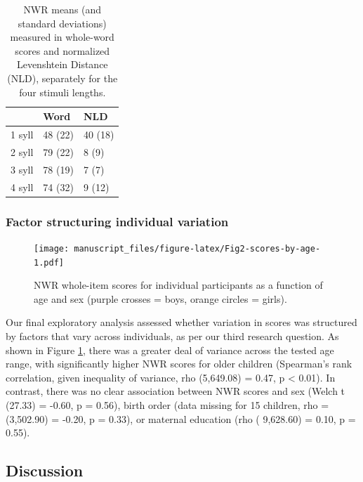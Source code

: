 \documentclass[english,,man,floatsintext]{apa6}
\begin{document}
\begin{table}

\caption{\label{tab:tablength}NWR means (and standard deviations) measured in whole-word scores and normalized Levenshtein Distance (NLD), separately for the four stimuli lengths.}
\centering
\begin{tabular}[t]{lll}
\toprule
  & Word & NLD\\
\midrule
1 syll & 48 (22) & 40 (18)\\
2 syll & 79 (22) & 8 (9)\\
3 syll & 78 (19) & 7 (7)\\
4 syll & 74 (32) & 9 (12)\\
\bottomrule
\end{tabular}
\end{table}

\hypertarget{factor-structuring-individual-variation}{%
\subsubsection{Factor structuring individual variation}\label{factor-structuring-individual-variation}}

\begin{figure}
\centering
\texttt{[image: manuscript\_files/figure-latex/Fig2-scores-by-age-1.pdf]}
\caption{\label{fig:Fig2-scores-by-age}NWR whole-item scores for individual participants as a function of age and sex (purple crosses = boys, orange circles = girls).}
\end{figure}

Our final exploratory analysis assessed whether variation in scores was structured by factors that vary across individuals, as per our third research question. As shown in Figure \ref{fig:Fig2-scores-by-age}, there was a greater deal of variance across the tested age range, with significantly higher NWR scores for older children (Spearman's rank correlation, given inequality of variance, rho (5,649.08) = 0.47, p \textless{} 0.01). In contrast, there was no clear association between NWR scores and sex (Welch t (27.33) = -0.60, p = 0.56), birth order (data missing for 15 children, rho = (3,502.90) = -0.20, p = 0.33), or maternal education (rho ( 9,628.60) = 0.10, p = 0.55).

\hypertarget{discussion}{%
\subsection{Discussion}\label{discussion}}
\end{document}
